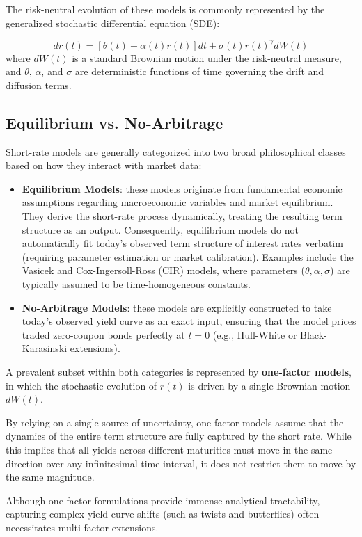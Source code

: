 The risk-neutral evolution of these models is commonly represented by the generalized stochastic differential equation (SDE):

$$dr(t) = \left[\theta(t) - \alpha(t)r(t)\right] dt + \sigma(t)r(t)^{\gamma} dW(t)$$
where $dW(t)$ is a standard Brownian motion under the risk-neutral measure, and $\theta$, $\alpha$, and $\sigma$ are deterministic functions of time governing the drift and diffusion terms.

\subsection{Equilibrium vs. No-Arbitrage}

Short-rate models are generally categorized into two broad philosophical classes based on how they interact with market data:
\begin{itemize}
\item \textbf{Equilibrium Models}: these models originate from fundamental economic assumptions regarding macroeconomic variables and market equilibrium. They derive the short-rate process dynamically, treating the resulting term structure as an output. Consequently, equilibrium models do not automatically fit today’s observed term structure of interest rates verbatim (requiring parameter estimation or market calibration). Examples include the Vasicek and Cox-Ingersoll-Ross (CIR) models, where parameters ($\theta, \alpha, \sigma$) are typically assumed to be time-homogeneous constants.
\item \textbf{No-Arbitrage Models}: these models are explicitly constructed to take today's observed yield curve as an exact input, ensuring that the model prices traded zero-coupon bonds perfectly at $t = 0$ (e.g., Hull-White or Black-Karasinski extensions).
\end{itemize}

A prevalent subset within both categories is represented by \textbf{one-factor models}, in which the stochastic evolution of $r(t)$ is driven by a single Brownian motion $dW(t)$.

By relying on a single source of uncertainty, one-factor models assume that the dynamics of the entire term structure are fully captured by the short rate. While this implies that all yields across different maturities must move in the same direction over any infinitesimal time interval, it does not restrict them to move by the same magnitude.

Although one-factor formulations provide immense analytical tractability, capturing complex yield curve shifts (such as twists and butterflies) often necessitates multi-factor extensions.

